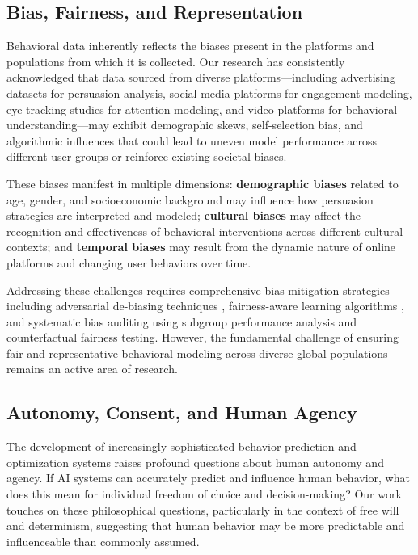 \subsection{Bias, Fairness, and Representation}

Behavioral data inherently reflects the biases present in the platforms and populations from which it is collected. Our research has consistently acknowledged that data sourced from diverse platforms—including advertising datasets for persuasion analysis, social media platforms for engagement modeling, eye-tracking studies for attention modeling, and video platforms for behavioral understanding—may exhibit demographic skews, self-selection bias, and algorithmic influences that could lead to uneven model performance across different user groups or reinforce existing societal biases.

These biases manifest in multiple dimensions: \textbf{demographic biases} related to age, gender, and socioeconomic background may influence how persuasion strategies are interpreted and modeled; \textbf{cultural biases} may affect the recognition and effectiveness of behavioral interventions across different cultural contexts; and \textbf{temporal biases} may result from the dynamic nature of online platforms and changing user behaviors over time.

Addressing these challenges requires comprehensive bias mitigation strategies including adversarial de-biasing techniques \cite{zhang2018mitigating}, fairness-aware learning algorithms \cite{hardt2016equality}, and systematic bias auditing using subgroup performance analysis and counterfactual fairness testing. However, the fundamental challenge of ensuring fair and representative behavioral modeling across diverse global populations remains an active area of research.

\subsection{Autonomy, Consent, and Human Agency}

The development of increasingly sophisticated behavior prediction and optimization systems raises profound questions about human autonomy and agency. If AI systems can accurately predict and influence human behavior, what does this mean for individual freedom of choice and decision-making? Our work touches on these philosophical questions, particularly in the context of free will and determinism, suggesting that human behavior may be more predictable and influenceable than commonly assumed.

